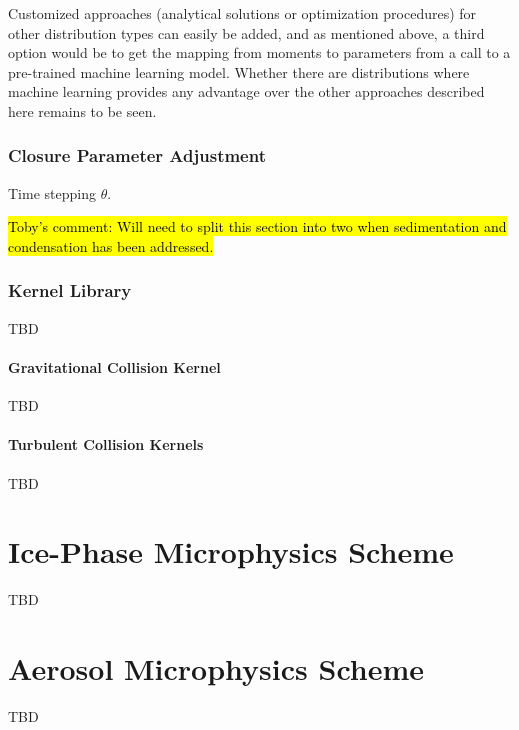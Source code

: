 \documentclass{report}
\begin{document}
Customized approaches (analytical solutions or optimization procedures) for other distribution types can easily be added, and as mentioned above, a third option would be to get the mapping from moments to parameters from a call to a pre-trained machine learning model. Whether there are distributions where machine learning provides any advantage over the other approaches described here remains to be seen.

\subsection{Closure Parameter Adjustment}
Time stepping $\theta$.


\hl{Toby's comment: Will need to split this section into two when sedimentation and condensation has been addressed.}

\subsection{Kernel Library}
TBD

\subsubsection{Gravitational Collision Kernel}
TBD

\subsubsection{Turbulent Collision Kernels}
TBD

\chapter{Ice-Phase Microphysics Scheme}
TBD

\chapter{Aerosol Microphysics Scheme}
TBD




\end{document}

